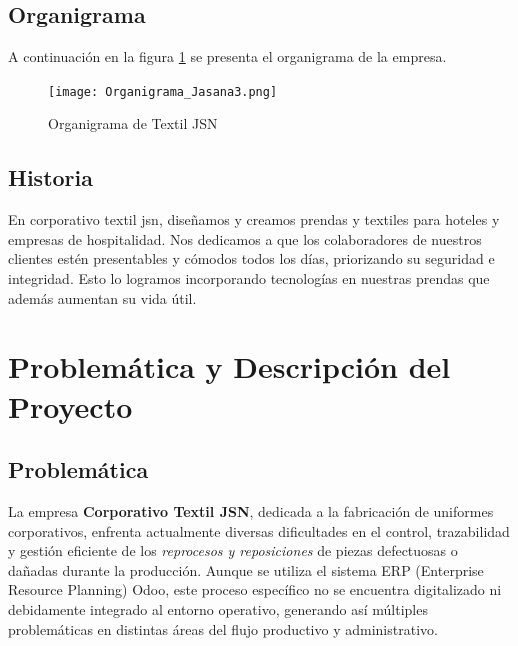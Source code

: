 \documentclass[12pt,letterpaper,spanish]{report}
\begin{document}
\section{Organigrama}
A continuación en la figura \ref{a2} se presenta el organigrama de la empresa.

\begin{figure}[htp]
  \centering
  \texttt{[image: Organigrama\_Jasana3.png]}
  \caption{Organigrama de Textil JSN}\label{a2}
\end{figure}

\section{Historia}
En corporativo textil jsn, diseñamos y creamos prendas y textiles para hoteles y empresas de hospitalidad.
Nos dedicamos a que los colaboradores de nuestros clientes estén presentables y cómodos todos los días, priorizando su seguridad e integridad.
Esto lo logramos incorporando tecnologías en nuestras prendas que además aumentan su vida útil.


\newpage




\chapter{Problemática y Descripción del Proyecto}
\newpage

\section{Problemática}

La empresa \textbf{Corporativo Textil JSN}, dedicada a la fabricación de uniformes corporativos, enfrenta actualmente diversas dificultades en el control, trazabilidad y gestión eficiente de los \textit{reprocesos y reposiciones} de piezas defectuosas o dañadas durante la producción. Aunque se utiliza el sistema ERP (Enterprise Resource Planning) Odoo, este proceso específico no se encuentra digitalizado ni debidamente integrado al entorno operativo, generando así múltiples problemáticas en distintas áreas del flujo productivo y administrativo.
\end{document}

